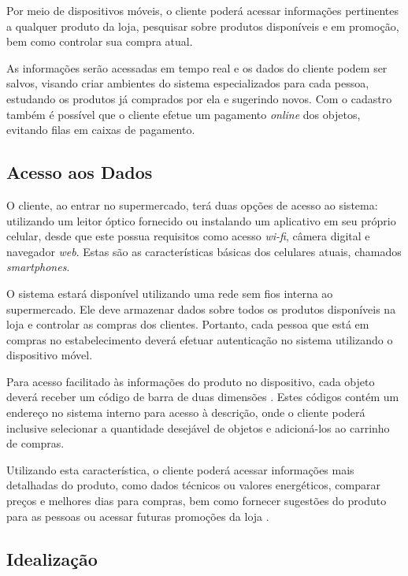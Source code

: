 \documentclass{article}
\begin{document}

Por meio de dispositivos móveis, o cliente poderá acessar informações
pertinentes a qualquer produto da loja, pesquisar sobre produtos disponíveis e
em promoção, bem como controlar sua compra atual.

As informações serão acessadas em tempo real e os dados do cliente podem ser
salvos, visando criar ambientes do sistema especializados para cada pessoa,
estudando os produtos já comprados por ela e sugerindo novos. Com o cadastro
também é possível que o cliente efetue um pagamento \emph{online} dos objetos,
evitando filas em caixas de pagamento.

\subsection{Acesso aos Dados}


O cliente, ao entrar no supermercado, terá duas opções de acesso ao sistema:
utilizando um leitor óptico fornecido ou instalando um aplicativo em seu próprio
celular, desde que este possua requisitos como acesso \emph{wi-fi}, câmera
digital e navegador \emph{web}. Estas são as características básicas dos
celulares atuais, chamados \emph{smartphones}.

O sistema estará disponível utilizando uma rede sem fios interna ao
supermercado. Ele deve armazenar dados sobre todos os produtos disponíveis na
loja e controlar as compras dos clientes. Portanto, cada pessoa que está em
compras no estabelecimento deverá efetuar autenticação no sistema utilizando o
dispositivo móvel.


Para acesso facilitado às informações do produto no dispositivo, cada objeto
deverá receber um código de barra de duas dimensões \cite{alapetite2010}. Estes
códigos contém um endereço no sistema interno para acesso à descrição, onde o
cliente poderá inclusive selecionar a quantidade desejável de objetos e
adicioná-los ao carrinho de compras.

Utilizando esta característica, o cliente poderá acessar informações mais
detalhadas do produto, como dados técnicos ou valores energéticos, comparar
preços e melhores dias para compras, bem como fornecer sugestões do produto para
as pessoas ou acessar futuras promoções da loja \cite{canny2006}.

\subsection{Idealização}
\end{document}
